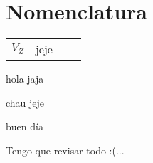 \documentclass[11pt,a4paper]{article}
\begin{document}
	\pagestyle{pieyencabezado}
	\section*{Nomenclatura}
	
	\begin{tabular}{r l r l}
		$V_Z$ & jeje &&\\
	\end{tabular}
	\begin{multicols}{2}
		\begin{cajita}
			hola jaja
		\end{cajita}
		
		
		\begin{cajita}
			chau jeje
		\end{cajita}
	\end{multicols}

	\begin{cajita}
		buen día
	\end{cajita}

	
	
	Tengo que revisar todo :(...
	
\end{document}
